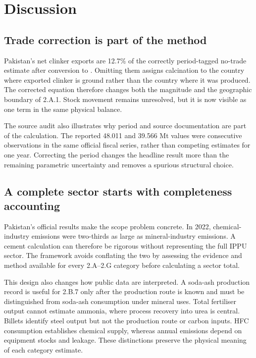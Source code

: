 \section{Discussion}
\label{sec:discussion}

\subsection{Trade correction is part of the method}

Pakistan's net clinker exports are 12.7\% of the correctly period-tagged no-trade estimate
after conversion to \COtwo{}. Omitting them assigns calcination to the country where exported
clinker is ground rather than the country where it was produced. The corrected equation
therefore changes both the magnitude and the geographic boundary of 2.A.1. Stock movement
remains unresolved, but it is now visible as one term in the same physical balance.

The source audit also illustrates why period and source documentation are part of the
calculation. The reported 48.011 and 39.566 Mt values were consecutive observations in the
same official fiscal series, rather than competing estimates for one year. Correcting the
period changes the headline result more than the remaining parametric uncertainty and removes
a spurious structural choice.

\subsection{A complete sector starts with completeness accounting}

Pakistan's official results make the scope problem concrete. In 2022, chemical-industry
emissions were two-thirds as large as mineral-industry emissions. A cement calculation can
therefore be rigorous without representing the full IPPU sector. The framework avoids
conflating the two by assessing the evidence and method available for every 2.A--2.G category
before calculating a sector total.

This design also changes how public data are interpreted. A soda-ash production record is
useful for 2.B.7 only after the production route is known and must be distinguished from
soda-ash consumption under mineral uses. Total fertiliser output cannot estimate ammonia,
where process \COtwo{} recovery into urea is central. Billets identify steel output but not
the production route or carbon inputs. HFC consumption establishes chemical supply, whereas
annual emissions depend on equipment stocks and leakage. These distinctions preserve the
physical meaning of each category estimate.

